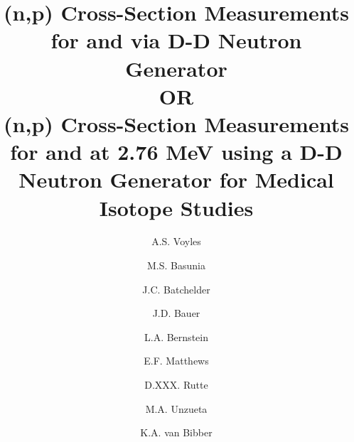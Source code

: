 \documentclass[5p]{elsarticle}
\begin{document}
\begin{frontmatter}


\title{(n,p) Cross-Section Measurements for  and  via D-D Neutron Generator\\ OR \\(n,p) Cross-Section Measurements for  and  at 2.76 MeV using a D-D Neutron Generator for Medical Isotope Studies}




\author[ucb]{A.S. Voyles }

\author[lbl]{M.S. Basunia}

\author[lbl]{J.C. Batchelder}

\author[llnl]{J.D. Bauer}

\author[ucb,lbl]{L.A. Bernstein}

\author[ucb]{E.F. Matthews}

\author[geo,eps]{D.XXX. Rutte}

\author[ucb]{M.A. Unzueta}

\author[ucb]{K.A. van Bibber}








\end{frontmatter}
\end{document}
